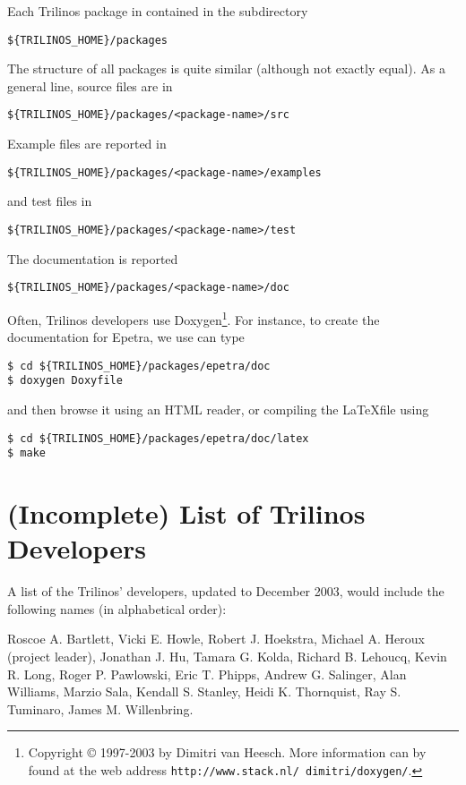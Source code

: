 Each Trilinos package in contained in the subdirectory
\begin{verbatim}
${TRILINOS_HOME}/packages
\end{verbatim}
The structure of all packages is quite similar (although not exactly
equal). As a general line, source files are in
\begin{verbatim}
${TRILINOS_HOME}/packages/<package-name>/src
\end{verbatim}
Example files are reported in \begin{verbatim}
${TRILINOS_HOME}/packages/<package-name>/examples
\end{verbatim}
and test files in
\begin{verbatim}
${TRILINOS_HOME}/packages/<package-name>/test
\end{verbatim}
The documentation is reported
\begin{verbatim}
${TRILINOS_HOME}/packages/<package-name>/doc
\end{verbatim}
Often, Trilinos developers use Doxygen\footnote{Copyright \copyright
  1997-2003 by Dimitri van Heesch. More information can by found at the
  web address {\tt http://www.stack.nl/~dimitri/doxygen/}.}. For
instance, to create the documentation for Epetra, we use can type
\begin{verbatim}
$ cd ${TRILINOS_HOME}/packages/epetra/doc
$ doxygen Doxyfile
\end{verbatim}
and then browse it using an HTML reader, or compiling the \LaTeX file
using
\begin{verbatim}
$ cd ${TRILINOS_HOME}/packages/epetra/doc/latex
$ make
\end{verbatim}


\section{(Incomplete) List of Trilinos Developers}
\label{sec:intro_incomplete}

A list of the Trilinos' developers, updated to December 2003, would
include the following names (in alphabetical order):

Roscoe A. Bartlett,
Vicki E. Howle,
Robert J. Hoekstra,
Michael A. Heroux (project leader),
Jonathan J. Hu,
Tamara G. Kolda,
Richard B. Lehoucq,
Kevin R. Long,
Roger P. Pawlowski,
Eric T. Phipps,
Andrew G. Salinger,
Alan Williams,
Marzio Sala,
Kendall S. Stanley,
Heidi K. Thornquist,
Ray S. Tuminaro,
James M. Willenbring.

